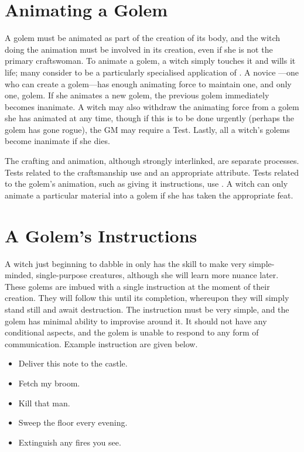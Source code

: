 
\section{Animating a Golem}

A golem must be animated as part of the creation of its body, and the witch doing the animation must be involved in its creation, even if she is not the primary craftswoman.
To animate a golem, a witch simply touches it and wills it life; many consider  to be a particularly specialised application of .
A novice ---one who can create a golem---has enough animating force to maintain one, and only one, golem.
If she animates a new golem, the previous golem immediately becomes inanimate.
A witch may also withdraw the animating force from a golem she has animated at any time, though if this is to be done urgently (perhaps the golem has gone rogue), the GM may require a Test.
Lastly, all a witch's golems become inanimate if she dies.

The crafting and animation, although strongly interlinked, are separate processes.
Tests related to the craftsmanship use  and an appropriate attribute.
Tests related to the golem's animation, such as giving it instructions, use .
A witch can only animate a particular material into a golem if she has taken the appropriate feat.

\section{A Golem's Instructions}

A witch just beginning to dabble in  only has the skill to make very simple-minded, single-purpose creatures, although she will learn more nuance later.
These golems are imbued with a single instruction at the moment of their creation.
They will follow this until its completion, whereupon they will simply stand still and await destruction.
The instruction must be very simple, and the golem has minimal ability to improvise around it.
It should not have any conditional aspects, and the golem is unable to respond to any form of communication.
Example instruction are given below.

\begin{itemize}
	\item Deliver this note to the castle.
	\item Fetch my broom.
	\item Kill that man.
	\item Sweep the floor every evening.
	\item Extinguish any fires you see.
\end{itemize}

